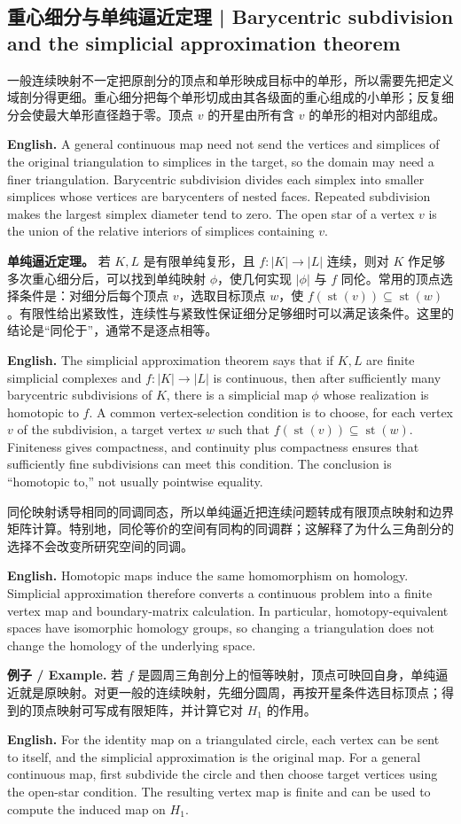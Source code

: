 \documentclass[UTF8,11pt,a4paper]{ctexart}
\newcommand{\EN}[1]{\par\noindent\textbf{English.} #1\par}
\newcommand{\EX}[2]{\par\noindent\textbf{例子 / Example.} #1\par\EN{#2}}
\begin{document}
\subsection{重心细分与单纯逼近定理 | Barycentric subdivision and the simplicial approximation theorem}
\noindent 一般连续映射不一定把原剖分的顶点和单形映成目标中的单形，所以需要先把定义域剖分得更细。重心细分把每个单形切成由其各级面的重心组成的小单形；反复细分会使最大单形直径趋于零。顶点 $v$ 的开星由所有含 $v$ 的单形的相对内部组成。
\EN{A general continuous map need not send the vertices and simplices of the original triangulation to simplices in the target, so the domain may need a finer triangulation. Barycentric subdivision divides each simplex into smaller simplices whose vertices are barycenters of nested faces. Repeated subdivision makes the largest simplex diameter tend to zero. The open star of a vertex $v$ is the union of the relative interiors of simplices containing $v$.}
\noindent\textbf{单纯逼近定理。} 若 $K,L$ 是有限单纯复形，且 $f:|K|\to|L|$ 连续，则对 $K$ 作足够多次重心细分后，可以找到单纯映射 $\phi$，使几何实现 $|\phi|$ 与 $f$ 同伦。常用的顶点选择条件是：对细分后每个顶点 $v$，选取目标顶点 $w$，使 $f(\operatorname{st}(v))\subseteq\operatorname{st}(w)$。有限性给出紧致性，连续性与紧致性保证细分足够细时可以满足该条件。这里的结论是“同伦于”，通常不是逐点相等。
\EN{The simplicial approximation theorem says that if $K,L$ are finite simplicial complexes and $f:|K|\to|L|$ is continuous, then after sufficiently many barycentric subdivisions of $K$, there is a simplicial map $\phi$ whose realization is homotopic to $f$. A common vertex-selection condition is to choose, for each vertex $v$ of the subdivision, a target vertex $w$ such that $f(\operatorname{st}(v))\subseteq\operatorname{st}(w)$. Finiteness gives compactness, and continuity plus compactness ensures that sufficiently fine subdivisions can meet this condition. The conclusion is “homotopic to,” not usually pointwise equality.}
\noindent 同伦映射诱导相同的同调同态，所以单纯逼近把连续问题转成有限顶点映射和边界矩阵计算。特别地，同伦等价的空间有同构的同调群；这解释了为什么三角剖分的选择不会改变所研究空间的同调。
\EN{Homotopic maps induce the same homomorphism on homology. Simplicial approximation therefore converts a continuous problem into a finite vertex map and boundary-matrix calculation. In particular, homotopy-equivalent spaces have isomorphic homology groups, so changing a triangulation does not change the homology of the underlying space.}
\EX{若 $f$ 是圆周三角剖分上的恒等映射，顶点可映回自身，单纯逼近就是原映射。对更一般的连续映射，先细分圆周，再按开星条件选目标顶点；得到的顶点映射可写成有限矩阵，并计算它对 $H_1$ 的作用。}{For the identity map on a triangulated circle, each vertex can be sent to itself, and the simplicial approximation is the original map. For a general continuous map, first subdivide the circle and then choose target vertices using the open-star condition. The resulting vertex map is finite and can be used to compute the induced map on $H_1$.}
\end{document}
